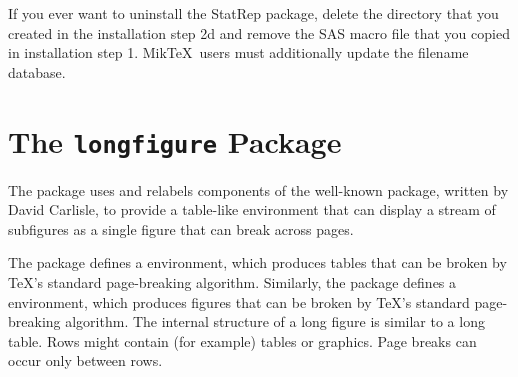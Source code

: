 \documentclass[article,oneside]{memoir}
\newcommand*{\StatRep}{\textsf{StatRep}\xspace}
\begin{document}
If you ever want to uninstall the \StatRep package,
delete the  directory that you created
in the installation step 2d and remove the SAS macro file 
that you copied in installation step 1.
   Mik\TeX\ users must additionally update the filename database.\\

\section{The \texttt{longfigure} Package}\label{longfigure}


    The  package uses and relabels components of the
    well-known  package, written by David Carlisle, to
    provide a table-like environment that can display a stream
    of subfigures as a single figure that can break across pages.

    The  package defines a  environment,
    which produces tables that can be broken by \TeX's standard page-breaking algorithm.
    Similarly, the  package defines a  environment, which produces
    figures that can be broken by \TeX's standard page-breaking algorithm.
    The internal structure of a long figure is similar to a long table.
    Rows might contain (for example) tables or graphics. Page breaks
    can occur only between rows.
\end{document}
